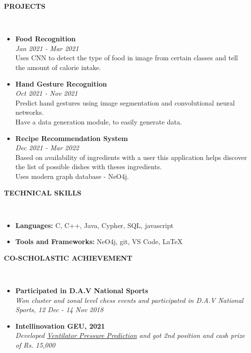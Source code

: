 \documentclass[a4paper,10pt]{article}
\newcommand{\lsep}{-0.5cm}
\newcommand{\resheading}[1]{{\small \colorbox{mygrey}{\begin{minipage}{0.975\textwidth}{\textbf{#1 \vphantom{p\^{E}}}}\end{minipage}}}}
\begin{document}
\resheading{\textbf{PROJECTS} }\\[\lsep]
\begin{itemize}
    \setlength\itemsep{0em}
    \item \noindent \textbf{Food Recognition} \\
          \textit{Jan 2021 - Mar 2021} \\
          Uses CNN to detect the type of food in image from certain classes and
          tell the amount of calorie intake.
    \item \noindent \textbf{Hand Gesture Recognition} \\
          \textit{Oct 2021 - Nov 2021} \\
          Predict hand gestures using image segmentation and convolutional neural networks. \\
          Have a data generation module, to easily generate data.
    \item \noindent \textbf{Recipe Recommendation System} \\
          \textit{Dec 2021 - Mar 2022} \\
          Based on availability of ingredients with a user this application
          helps discover the list of possible dishes with theses ingredients. \\
          Uses modern graph database - NeO4j.
\end{itemize}

\resheading{\textbf{TECHNICAL SKILLS} }\\[\lsep]
\begin{itemize}
    \setlength\itemsep{0em}
    \item \noindent \textbf{Languages:} C, C++, Java, Cypher, SQL, javascript
    \item \noindent \textbf{Tools and Frameworks:} NeO4j, git, VS Code, \LaTeX
\end{itemize}

\resheading{\textbf{CO-SCHOLASTIC ACHIEVEMENT} }\\[\lsep]
\begin{itemize}
    \setlength\itemsep{0em}
    \item \noindent \textbf{Participated in D.A.V National Sports} \\
          \textit{Won cluster and zonal level chess events and participated in D.A.V National Sports, 12 Dec - 14 Nov 2018}
    \item \noindent \textbf{Intellinovation GEU, 2021} \\
          \textit{Developed \href{https://www.github.com/Bot-7037/Ventilator-Pressure-Prediction}{Ventilator Pressure Prediction} and got 2nd position and cash prize of Rs. 15,000 }
\end{itemize}
\end{document}

